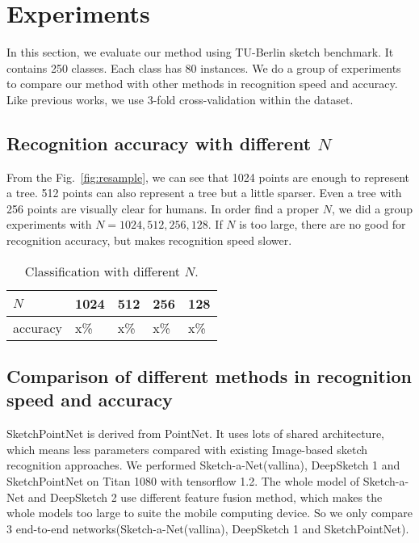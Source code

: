 \section{Experiments}
\label{sec:experiments}
In this section, we evaluate our method using  TU-Berlin sketch benchmark. It contains 250 classes. Each class has 80 instances. We do a group of experiments to compare our method with other methods in recognition speed and accuracy. Like previous works, we use 3-fold cross-validation within the dataset.


\subsection{Recognition accuracy with different $N$}
\label{ssec:resample_number}

From the Fig.~\ref{fig:resample}, we can see that 1024 points are enough to represent a tree. 512 points can also represent a tree but a little sparser. Even a tree with 256 points are visually clear for humans. In order find a proper $N$, we did a group experiments with $N = 1024, 512, 256, 128$. If $N$ is too large, there are no good for recognition accuracy, but makes recognition speed slower.

\begin{table}[htbp]
\begin{tabular}{|p{1.4cm}|p{1.3cm}|p{1.3cm}|p{1.3cm}|p{1.3cm}|}
    \hline
     $N$ & 1024& 512 & 256 & 128\\
    \hline
     accuracy & x\% & x\% & x\%& x\%\\
    \hline
\end{tabular}
\caption{Classification with different $N$.}
\end{table}

\subsection{Comparison of different methods in recognition speed and accuracy}
\label{ssec:cm_speed}
SketchPointNet is derived from PointNet. It uses lots of shared architecture, which means less parameters compared with existing Image-based sketch recognition approaches. We performed Sketch-a-Net(vallina), DeepSketch 1 and SketchPointNet on Titan 1080 with tensorflow 1.2. The whole model of Sketch-a-Net and DeepSketch 2 \cite{Dupont2016DeepSketch2D} use different feature fusion method, which makes the whole models too large to suite the mobile computing device. So we only compare 3 end-to-end networks(Sketch-a-Net(vallina), DeepSketch 1 and SketchPointNet).

